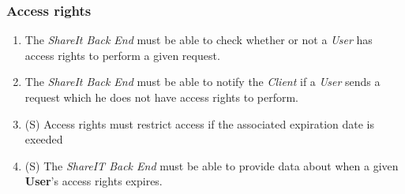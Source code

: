 \subsubsection{Access rights}
\begin{enumerate}[label=\textbf{FR-\twodigits*},resume]

\item The \textit{ShareIt Back End} must be able to check whether or not a \textit{User} has access rights to perform a given request.

\item The \textit{ShareIt Back End} must be able to notify the \textit{Client} if a \textit{User} sends a request which he does not have access rights to perform.

\item (S) Access rights must restrict access if the associated expiration date is exeeded

\item (S) The \textit{ShareIT Back End} must be able to provide data about when a given \textbf{User}'s access rights expires.

\end{enumerate}

%